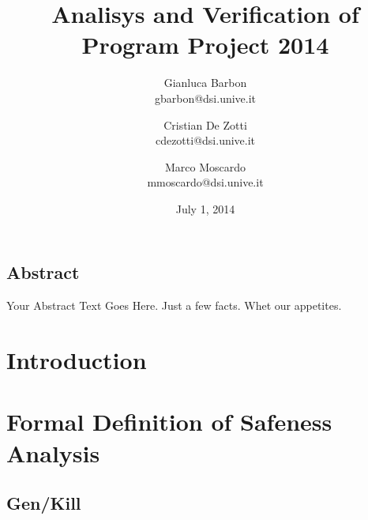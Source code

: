\documentclass[letterpaper,twocolumn,10pt]{article}
\begin{document}
\title{\Large \bf Analisys and Verification of Program Project 2014}

\author{
{\rm Gianluca Barbon}\\
gbarbon@dsi.unive.it
\and
{\rm Cristian De Zotti}\\
cdezotti@dsi.unive.it
\and
{\rm Marco Moscardo}\\
mmoscardo@dsi.unive.it
}
\date{July 1, 2014}
\maketitle

\thispagestyle{empty}


\subsection*{Abstract}
Your Abstract Text Goes Here.  Just a few facts.
Whet our appetites.



\section{Introduction}
\paragraph{}



\section{Formal Definition of Safeness Analysis}
\paragraph{}

\subsection{Gen/Kill}
\end{document}
